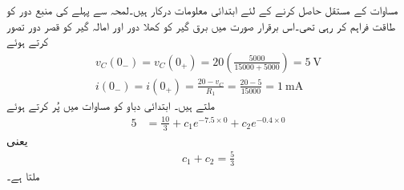 مساوات کے مستقل حاصل کرنے کے لئے ابتدائی معلومات درکار ہیں۔لمحہ  سے پہلے  کی منبع دور کو طاقت فراہم کر رہی تھی۔اس برقرار صورت میں برق گیر کو کھلا دور اور امالہ گیر کو قصر دور تصور کرتے ہوئے
\begin{align*}
v_C(0_-)=v_C(0_+)=20 \left(\frac{5000}{15000+5000}\right)=\SI{5}{\volt}\\
i(0_-)=i(0_+)=\frac{20-v_C}{R_1}=\frac{20-5}{15000}=\SI{1}{\milli\ampere}
\end{align*}
ملتے ہیں۔ ابتدائی دباو کو مساوات  میں پُر کرتے ہوئے
  \begin{align*}
5&=\frac{10}{3}+c_1 e^{-7.5\times 0}+c_2e^{-0.4\times 0}
\end{align*}
یعنی
\begin{align}\label{مساوات_عارضی_مستقل_مثال_دس_الف}
c_1+c_2=\frac{5}{3}
\end{align}
ملتا ہے۔

